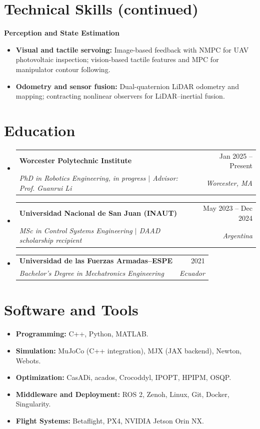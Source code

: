 \documentclass[letterpaper,11pt]{article}
\makeatletter
\newcommand{\resumeSubheading}[4]{
  \vspace{-2pt}\item
    \begin{tabular*}{0.97\textwidth}[t]{l@{\extracolsep{\fill}}r}
      \textbf{#1} & #2 \\
      \textit{\small#3} & \textit{\small #4} \\
    \end{tabular*}\vspace{-7pt}
}
\newcommand{\resumeSubHeadingListStart}{\begin{itemize}[leftmargin=0.15in, label={}, topsep=3pt]}
\newcommand{\resumeSubHeadingListEnd}{\end{itemize}}
\makeatother
\begin{document}
\section{Technical Skills (continued)}
{\small\textbf{Perception and State Estimation}\par}
\begin{itemize}[leftmargin=0.22in, itemsep=2pt, parsep=0pt, topsep=4pt]
\small
\item \textbf{Visual and tactile servoing:} Image-based feedback with NMPC for UAV photovoltaic inspection; vision-based tactile features and MPC for manipulator contour following.
\item \textbf{Odometry and sensor fusion:} Dual-quaternion LiDAR odometry and mapping; contracting nonlinear observers for LiDAR--inertial fusion.
\end{itemize}

\section{Education}
\resumeSubHeadingListStart
\resumeSubheading{Worcester Polytechnic Institute}{Jan 2025 -- Present}
{PhD in Robotics Engineering, in progress $|$ Advisor: Prof. Guanrui Li}{Worcester, MA}
\resumeSubheading{Universidad Nacional de San Juan (INAUT)}{May 2023 -- Dec 2024}
{MSc in Control Systems Engineering $|$ DAAD scholarship recipient}{Argentina}
\resumeSubheading{Universidad de las Fuerzas Armadas--ESPE}{2021}
{Bachelor's Degree in Mechatronics Engineering}{Ecuador}
\resumeSubHeadingListEnd

\section{Software and Tools}
\begin{itemize}[leftmargin=0.15in, label={}, itemsep=2pt, parsep=0pt, topsep=3pt]
\small
\item \textbf{Programming:} C++, Python, MATLAB.
\item \textbf{Simulation:} MuJoCo (C++ integration), MJX (JAX backend), Newton, Webots.
\item \textbf{Optimization:} CasADi, acados, Crocoddyl, IPOPT, HPIPM, OSQP.
\item \textbf{Middleware and Deployment:} ROS 2, Zenoh, Linux, Git, Docker, Singularity.
\item \textbf{Flight Systems:} Betaflight, PX4, NVIDIA Jetson Orin NX.
\end{itemize}
\end{document}
